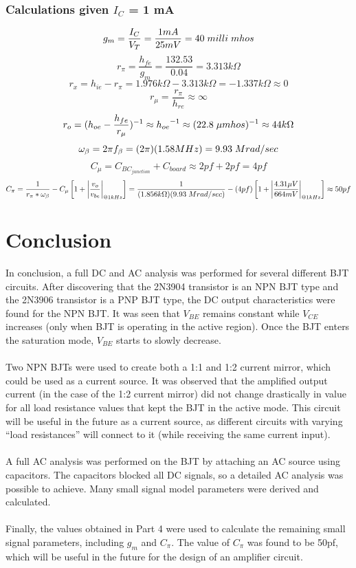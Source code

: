 \documentclass{article}
\begin{document}
	\pagebreak
	\subsubsection{Calculations given $I_C$ = 1 mA}
	\vspace{0.5cm}
	$$g_m = \frac{I_C}{V_T} = \frac{1mA}{25mV} = 40 \hspace{1mm} milli \hspace{1mm} mhos$$
	$$r_{\pi} = \frac{h_{fe}}{g_m} = \frac{132.53}{0.04} = 3.313 k\Omega$$
	$$r_x = h_{ie} - r_{\pi} = 1.976 k\Omega - 3.313 k\Omega = - 1.337 k\Omega \approx 0$$
	$$r_{\mu} = \frac{r_{\pi}}{h_{re}} \approx \infty$$
	$$r_o = (h_{oe} - \frac{h_{fe}}{r_{\mu}})^{-1} \approx {h_{oe}}^{-1} \approx (22.8 \hspace{1mm} \mu mhos)^{-1} \approx 44 k\Omega$$
	$$\omega_{\beta} = 2\pi f_{\beta} = (2\pi) (1.58 MHz) = 9.93 \hspace{1mm} Mrad/sec$$
	$$C_{\mu} = C_{BC_{junction}} + C_{board} \approx 2pf + 2pf = 4pf$$
	$$C_{\pi} = \frac{1}{r_{\pi} * \omega_{\beta}} - C_{\mu} \left [ 1 + \left | \frac{v_o}{v_{be}} \right |_{@ 1kHz} \right ] = \frac{1}{(1.856 k\Omega) (9.93 \hspace{1mm} Mrad/sec)} - (4pf) \left [ 1 + \left | \frac{4.31 \mu V}{664mV} \right |_{@ 1kHz} \right ] \approx 50pf$$
	
	\pagebreak
	
	\section{Conclusion}
	In conclusion, a full DC and AC analysis was performed for several different BJT circuits.
	After discovering that the 2N3904 transistor is an NPN BJT type and the 2N3906 transistor is a PNP BJT type, the DC output characteristics were found for the NPN BJT.
	It was seen that $V_{BE}$ remains constant while $V_{CE}$ increases (only when BJT is operating in the active region).
	Once the BJT enters the saturation mode, $V_{BE}$ starts to slowly decrease.\\\\
	Two NPN BJTs were used to create both a 1:1 and 1:2 current mirror, which could be used as a current source.
	It was observed that the amplified output current (in the case of the 1:2 current mirror) did not change drastically in value for all load resistance values that kept the BJT in the active mode.
	This circuit will be useful in the future as a current source, as different circuits with varying “load resistances” will connect to it (while receiving the same current input).\\\\
	A full AC analysis was performed on the BJT by attaching an AC source using capacitors.
	The capacitors blocked all DC signals, so a detailed AC analysis was possible to achieve.
	Many small signal model parameters were derived and calculated.\\\\
	Finally, the values obtained in Part 4 were used to calculate the remaining small signal parameters, including $g_m$ and $C_{\pi}$.
	The value of $C_{\pi}$ was found to be 50pf, which will be useful in the future for the design of an amplifier circuit.
	
\end{document}

